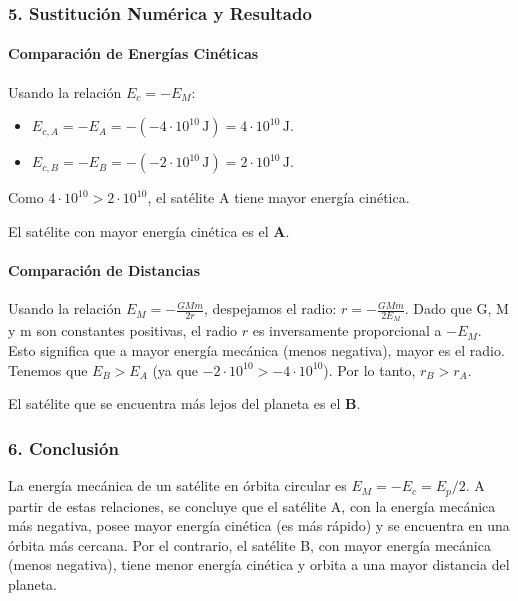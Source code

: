 \subsubsection*{5. Sustitución Numérica y Resultado}
\paragraph*{Comparación de Energías Cinéticas}
Usando la relación $E_c = -E_M$:
\begin{itemize}
    \item $E_{c,A} = -E_A = -(-4\cdot10^{10}\,\text{J}) = 4\cdot10^{10}\,\text{J}$.
    \item $E_{c,B} = -E_B = -(-2\cdot10^{10}\,\text{J}) = 2\cdot10^{10}\,\text{J}$.
\end{itemize}
Como $4\cdot10^{10} > 2\cdot10^{10}$, el satélite A tiene mayor energía cinética.
\begin{cajaresultado}
    El satélite con mayor energía cinética es el \textbf{A}.
\end{cajaresultado}
\paragraph*{Comparación de Distancias}
Usando la relación $E_M = -\frac{GMm}{2r}$, despejamos el radio: $r = -\frac{GMm}{2E_M}$.
Dado que G, M y m son constantes positivas, el radio $r$ es inversamente proporcional a $-E_M$. Esto significa que a mayor energía mecánica (menos negativa), mayor es el radio.
Tenemos que $E_B > E_A$ (ya que $-2\cdot10^{10} > -4\cdot10^{10}$). Por lo tanto, $r_B > r_A$.
\begin{cajaresultado}
    El satélite que se encuentra más lejos del planeta es el \textbf{B}.
\end{cajaresultado}

\subsubsection*{6. Conclusión}
\begin{cajaconclusion}
La energía mecánica de un satélite en órbita circular es $E_M = -E_c = E_p/2$. A partir de estas relaciones, se concluye que el satélite A, con la energía mecánica más negativa, posee mayor energía cinética (es más rápido) y se encuentra en una órbita más cercana. Por el contrario, el satélite B, con mayor energía mecánica (menos negativa), tiene menor energía cinética y orbita a una mayor distancia del planeta.
\end{cajaconclusion}

